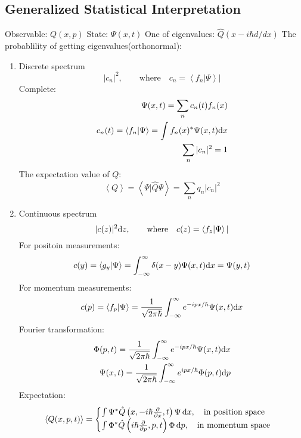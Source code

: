 \documentclass[a4paper,12pt]{article}
\begin{document}
\subsection{Generalized Statistical Interpretation}
Observable: \(Q(x,p)\) \newline
State: \(\Psi(x,t)\) \newline
One of eigenvalues: \(\hat{Q}(x-i\hbar d/dx)\) \newline
The probablility of getting eigenvalues(orthonormal):
\begin{enumerate}
       \item Discrete spectrum \[
              |c_n|^2,\qquad\text{where}\quad c_n=\left\langle f_n|\Psi\right\rangle |\]
              Complete: \[\begin{split}
                     \Psi(x,t) = \sum_n c_n(t)f_n(x)  \\
                     c_n(t)=\left\langle f_n|\Psi\right\rangle  = \int f_n(x)^*\Psi(x,t){\rm d}x \\
                     \sum_n|c_n|^2=1
              \end{split}\]
              The expectation value of \(Q\): \[
                     \left\langle Q\right\rangle  = \left\langle \Psi|\hat{Q}\Psi\right\rangle = \sum_n q_n|c_n|^2
                     \]
       \item Continuous spectrum \[
              |c(z)|^2{\rm d}z,\qquad\text{where}\quad c(z)=\left\langle f_z|\Psi\right\rangle |\]
For positoin measurements:
\[
       c(y)=\left\langle g_y|\Psi\right\rangle  = \int_{-\infty}^\infty\delta(x-y)\Psi(x,t){\rm d}x = \Psi(y,t)
\]
For momentum measurements:\[
       c(p) = \left\langle f_p|\Psi\right\rangle =  \frac{1}{\sqrt{2\pi\hbar}}
       \int_{-\infty}^\infty e^{-ipx/\hbar}\Psi(x,t){\rm d}x
\]
Fourier transformation:\[\begin{aligned}
       \Phi(p,t) = \frac{1}{\sqrt{2\pi\hbar}}\int_{-\infty}^\infty e^{-ipx/\hbar}\Psi(x,t){\rm d}x \\
       \Psi(x,t) = \frac{1}{\sqrt{2\pi\hbar}}\int_{-\infty}^\infty e^{ipx/\hbar}\Phi(p,t){\rm d}p \\
\end{aligned}\]
Expectation: \begin{equation*}
       \left\langle Q(x,p,t)\right\rangle = \begin{cases}
              \int \Psi^*\hat{Q}\left(x,-i\hbar\frac{\partial}{\partial x},t\right)\Psi\,{\rm d}x,\quad \text{in position space}  \\
              \int \Phi^*\hat{Q}\left(i\hbar\frac{\partial}{\partial p},p,t\right) \Phi \,{\rm d}p,\quad \text{in momentum space}
       \end{cases}
\end{equation*}
\end{enumerate}
\end{document}
